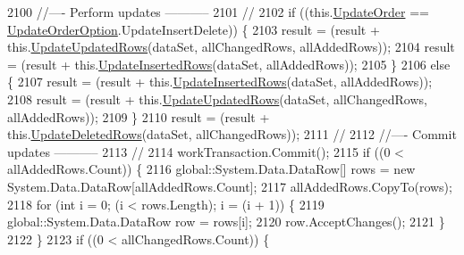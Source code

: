 \begin{DoxyCode}
2100                 \textcolor{comment}{//---- Perform updates -----------}
2101                 \textcolor{comment}{//}
2102                 \textcolor{keywordflow}{if} ((this.\hyperlink{class_proyecto___integrador__3_1_1ds_usuarios_table_adapters_1_1_table_adapter_manager_a55b567eb81edc368c8637f879397a7ad}{UpdateOrder} == \hyperlink{class_proyecto___integrador__3_1_1ds_usuarios_table_adapters_1_1_table_adapter_manager_a3e5008a49cc02b346d809e432b3a9412}{UpdateOrderOption}.UpdateInsertDelete))
       \{
2103                     result = (result + this.\hyperlink{class_proyecto___integrador__3_1_1ds_usuarios_table_adapters_1_1_table_adapter_manager_aa003ee514ac1b5226bb95a04c7889bfd}{UpdateUpdatedRows}(dataSet, allChangedRows, 
      allAddedRows));
2104                     result = (result + this.\hyperlink{class_proyecto___integrador__3_1_1ds_usuarios_table_adapters_1_1_table_adapter_manager_aac4ab48768593e57aa4585e7f9e563fd}{UpdateInsertedRows}(dataSet, allAddedRows));
2105                 \}
2106                 \textcolor{keywordflow}{else} \{
2107                     result = (result + this.\hyperlink{class_proyecto___integrador__3_1_1ds_usuarios_table_adapters_1_1_table_adapter_manager_aac4ab48768593e57aa4585e7f9e563fd}{UpdateInsertedRows}(dataSet, allAddedRows));
2108                     result = (result + this.\hyperlink{class_proyecto___integrador__3_1_1ds_usuarios_table_adapters_1_1_table_adapter_manager_aa003ee514ac1b5226bb95a04c7889bfd}{UpdateUpdatedRows}(dataSet, allChangedRows, 
      allAddedRows));
2109                 \}
2110                 result = (result + this.\hyperlink{class_proyecto___integrador__3_1_1ds_usuarios_table_adapters_1_1_table_adapter_manager_ae933d35755403c4abbe8e89426018f46}{UpdateDeletedRows}(dataSet, allChangedRows));
2111                 \textcolor{comment}{// }
2112                 \textcolor{comment}{//---- Commit updates -----------}
2113                 \textcolor{comment}{//}
2114                 workTransaction.Commit();
2115                 \textcolor{keywordflow}{if} ((0 < allAddedRows.Count)) \{
2116                     global::System.Data.DataRow[] rows = \textcolor{keyword}{new} System.Data.DataRow[allAddedRows.Count];
2117                     allAddedRows.CopyTo(rows);
2118                     \textcolor{keywordflow}{for} (\textcolor{keywordtype}{int} i = 0; (i < rows.Length); i = (i + 1)) \{
2119                         global::System.Data.DataRow row = rows[i];
2120                         row.AcceptChanges();
2121                     \}
2122                 \}
2123                 \textcolor{keywordflow}{if} ((0 < allChangedRows.Count)) \{

\end{DoxyCode}
